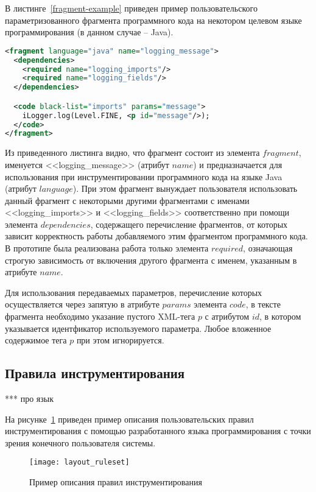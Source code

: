 В листинге~\ref{fragment-example} приведен пример пользовательского параметризованного фрагмента программного кода на некотором целевом языке программирования (в данном случае -- Java).

\begin{lstlisting}[frame=single, language=XML, label={fragment-example}, caption={Пример пользовательского фрагмента}]
<fragment language="java" name="logging_message">
  <dependencies>
    <required name="logging_imports"/>
    <required name="logging_fields"/>
  </dependencies>

  <code black-list="imports" params="message">
    iLogger.log(Level.FINE, <p id="message"/>);
  </code>
</fragment>
\end{lstlisting}

Из приведенного листинга видно, что фрагмент состоит из элемента $fragment$, именуется <<logging\_message>> (атрибут $name$) и предназначается для использования при инструментировании программного кода на языке Java (атрибут $language$).
При этом фрагмент вынуждает пользователя использовать данный фрагмент с некоторыми другими фрагментами с именами <<logging\_imports>> и <<logging\_fields>> соответственно при помощи элемента $dependencies$, содержащего перечисление фрагментов, от которых зависит корректность работы добавляемого этим фрагментом программного кода.
В прототипе была реализована работа только элемента $required$, означающая строгую зависимость от включения другого фрагмента с именем, указанным в атрибуте $name$.

Для использования передаваемых параметров, перечисление которых осуществляется через запятую в атрибуте $params$ элемента $code$, в тексте фрагмента необходимо указание пустого XML-тега $p$ с атрибутом $id$, в котором указывается идентфикатор используемого параметра.
Любое вложенное содержимое тега $p$ при этом игнорируется.

\subsection{Правила инструментирования}

***
про язык

На рисунке~\ref{fig:layout-ruleset} приведен пример описания пользовательских правил инструментирования с помощью разработанного языка программирования с точки зрения конечного пользователя системы.

\begin{figure}[!h]
	\centering
	\texttt{[image: layout\_ruleset]}
	\caption{Пример описания правил инструментирования}
	\label{fig:layout-ruleset}
\end{figure}

